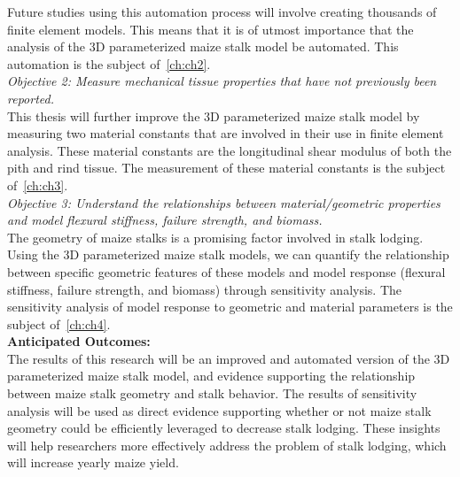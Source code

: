 Future studies using this automation process will involve creating thousands of finite element models. This means that it is of utmost importance that the analysis of the 3D parameterized maize stalk model be automated. This automation is the subject of~\cref{ch:ch2}.
\\ \hfill \break
\textit{Objective 2: Measure mechanical tissue properties that have not previously been reported.}
\\
This thesis will further improve the 3D parameterized maize stalk model by measuring two material constants that are involved in their use in finite element analysis. These material constants are the longitudinal shear modulus of both the pith and rind tissue. The measurement of these material constants is the subject of~\cref{ch:ch3}.
\\ \hfill \break
\textit{Objective 3: Understand the relationships between material/geometric properties and model flexural stiffness, failure strength, and biomass.}
\\
The geometry of maize stalks is a promising factor involved in stalk lodging. Using the 3D parameterized maize stalk models, we can quantify the relationship between specific geometric features of these models and model response (flexural stiffness, failure strength, and biomass) through sensitivity analysis. The sensitivity analysis of model response to geometric and material parameters is the subject of~\cref{ch:ch4}.
\\ \hfill \break
\textbf{Anticipated Outcomes:}
\\
The results of this research will be an improved and automated version of the 3D parameterized maize stalk model, and evidence supporting the relationship between maize stalk geometry and stalk behavior. The results of sensitivity analysis will be used as direct evidence supporting whether or not maize stalk geometry could be efficiently leveraged to decrease stalk lodging. These insights will help researchers more effectively address the problem of stalk lodging, which will increase yearly maize yield.
